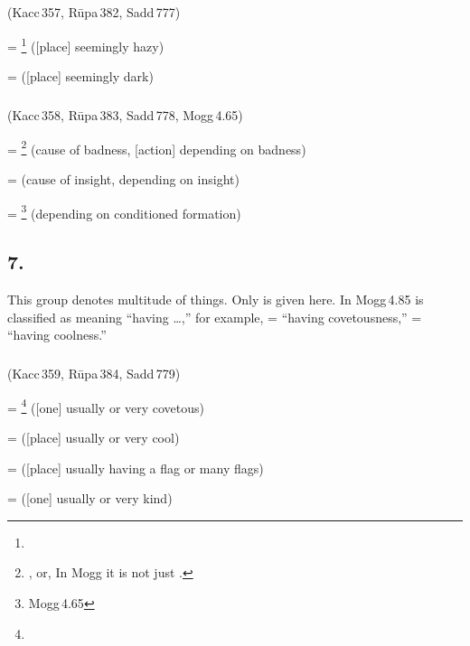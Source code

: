 \subparagraph*{} (Kacc\,357, R\=upa\,382, Sadd\,777)\label{pacct6:aayitta}

 = \footnote{} ([place] seemingly hazy) \par
{} =  ([place] seemingly dark) \par

\subparagraph*{} (Kacc\,358, R\=upa\,383, Sadd\,778, Mogg\,4.65)\label{pacct6:la}\label{pacct6:lla}\label{pacct6:illa}

 = \footnote{, or,  In Mogg it is  not just .} (cause of badness, [action] depending on badness) \par
{} =  (cause of insight, depending on insight) \par
{} = \footnote{Mogg\,4.65} (depending on conditioned formation) \par

\subsection*{7.\ }\label{tadgroup7}

This group denotes multitude of things. Only  is given here. In Mogg\,4.85  is classified as  meaning ``having \ldots,'' for example,  = ``having covetousness,''  = ``having coolness.''

\subparagraph*{} (Kacc\,359, R\=upa\,384, Sadd\,779)\label{pacct7:aalu}

 = \footnote{} ([one] usually or very covetous) \par
{} =  ([place] usually or very cool) \par
{} =  ([place] usually having a flag or many flags) \par
{} =  ([one] usually or very kind) \par

